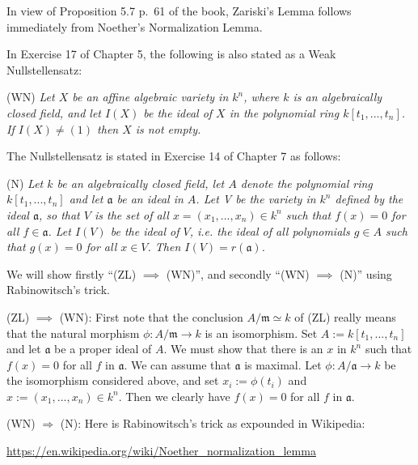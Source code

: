 \documentclass[12pt]{article}
\newcommand{\mf}{\mathfrak}
\begin{document}
In view of Proposition 5.7 p.~61 of the book, Zariski's \- Lemma follows immediately from Noether's Normalization Lemma.

In Exercise 17 of Chapter 5, the following is also stated as a Weak Nullstellensatz:

(WN) \emph{Let $X$ be an affine algebraic variety in $k^n$, where $k$ is an algebraically closed field, and let $I(X)$ be the ideal of $X$ in the polynomial ring $k[t_1,...,t_n]$. If $I(X)\neq(1)$ then $X$ is not empty.}

The Nullstellensatz is stated in Exercise 14 of Chapter 7 as follows:

(N) \emph{Let $k$ be an algebraically closed field, let $A$ denote the polynomial ring $k[t_1,...,t_n]$ and let $\mf a$ be an ideal in $A$. Let V be the variety in $k^n$ defined by the ideal $\mf a$, so that $V$ is the set of all $x=(x_1,...,x_n)\in k^n$ such that $f(x)=0$ for all $f\in\mf a$. Let $I(V)$ be the ideal of $V$, i.e. the ideal of all polynomials $g\in A$ such that $g(x)=0$ for all $x\in V$. Then $I(V)=r(\mf a)$.}

We will show firstly ``(ZL) $\implies$ (WN)'', and secondly ``(WN) $\implies$ (N)'' using Rabinowitsch's trick.

(ZL) $\implies$ (WN): First note that the conclusion $A/\mf m\simeq k$ of (ZL) really means that the natural morphism $\phi:A/\mf m\to k$ is an isomorphism. Set $A:=k[t_1,...,t_n]$ and let $\mf a$ be a proper ideal of $A$. We must show that there is an $x$ in $k^n$ such that $f(x)=0$ for all $f$ in $\mf a$. We can assume that $\mf a$ is maximal. Let $\phi:A/\mf a\to k$ be the isomorphism considered above, and set $x_i:=\phi(t_i)$ and $x:=(x_1,...,x_n)\in k^n$. Then we clearly have $f(x)=0$ for all $f$ in $\mf a$.

(WN) $\Rightarrow$ (N): Here is Rabinowitsch's trick as expounded in Wikipedia:

\href{https://en.wikipedia.org/wiki/Noether_normalization_lemma}{\small https://en.wikipedia.org/wiki/Noether\_normalization\_lemma}
\end{document}

